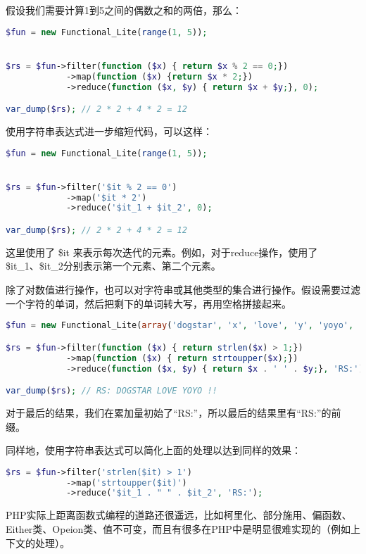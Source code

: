 假设我们需要计算1到5之间的偶数之和的两倍，那么：

\begin{lstlisting}[language=PHP]
$fun = new Functional_Lite(range(1, 5));


$rs = $fun->filter(function ($x) { return $x % 2 == 0;})
            ->map(function ($x) {return $x * 2;})
            ->reduce(function ($x, $y) { return $x + $y;}, 0);

var_dump($rs); // 2 * 2 + 4 * 2 = 12
\end{lstlisting}

使用字符串表达式进一步缩短代码，可以这样：

\begin{lstlisting}[language=PHP]
$fun = new Functional_Lite(range(1, 5));


$rs = $fun->filter('$it % 2 == 0')
            ->map('$it * 2')
            ->reduce('$it_1 + $it_2', 0);

var_dump($rs); // 2 * 2 + 4 * 2 = 12
\end{lstlisting}

这里使用了 \$it 来表示每次迭代的元素。例如，对于reduce操作，使用了\$it\_1、\$it\_2分别表示第一个元素、第二个元素。

除了对数值进行操作，也可以对字符串或其他类型的集合进行操作。假设需要过滤一个字符的单词，然后把剩下的单词转大写，再用空格拼接起来。

\begin{lstlisting}[language=PHP]
$fun = new Functional_Lite(array('dogstar', 'x', 'love', 'y', 'yoyo', '!!'));

$rs = $fun->filter(function ($x) { return strlen($x) > 1;})
            ->map(function ($x) { return strtoupper($x);})
            ->reduce(function ($x, $y) { return $x . ' ' . $y;}, 'RS:');

var_dump($rs); // RS: DOGSTAR LOVE YOYO !!
\end{lstlisting}

对于最后的结果，我们在累加量初始了“RS:”，所以最后的结果里有“RS:”的前缀。

同样地，使用字符串表达式可以简化上面的处理以达到同样的效果：

\begin{lstlisting}[language=PHP]
$rs = $fun->filter('strlen($it) > 1')
            ->map('strtoupper($it)')
            ->reduce('$it_1 . " " . $it_2', 'RS:');
\end{lstlisting}

PHP实际上距离函数式编程的道路还很遥远，比如柯里化、部分施用、偏函数、Either类、Opeion类、值不可变，而且有很多在PHP中是明显很难实现的（例如上下文的处理）。


